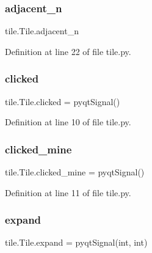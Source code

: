 \subsubsection{\texorpdfstring{adjacent\_n}{adjacent\_n}}
{\footnotesize\ttfamily tile.\+Tile.\+adjacent\+\_\+n}



Definition at line 22 of file tile.\+py.

\mbox{\label{classtile_1_1_tile_ae9f624960119eb87e6d64a1563ac6079}} 
\subsubsection{\texorpdfstring{clicked}{clicked}}
{\footnotesize\ttfamily tile.\+Tile.\+clicked = pyqt\+Signal()\hspace{0.3cm}{\ttfamily [static]}}



Definition at line 10 of file tile.\+py.

\mbox{\label{classtile_1_1_tile_a944560e1cb2bb5ccd3849527fc5dd736}} 
\subsubsection{\texorpdfstring{clicked\_mine}{clicked\_mine}}
{\footnotesize\ttfamily tile.\+Tile.\+clicked\+\_\+mine = pyqt\+Signal()\hspace{0.3cm}{\ttfamily [static]}}



Definition at line 11 of file tile.\+py.

\mbox{\label{classtile_1_1_tile_ae9b20af77c912b727aabee12e0619af7}} 
\subsubsection{\texorpdfstring{expand}{expand}}
{\footnotesize\ttfamily tile.\+Tile.\+expand = pyqt\+Signal(int, int)\hspace{0.3cm}{\ttfamily [static]}}




